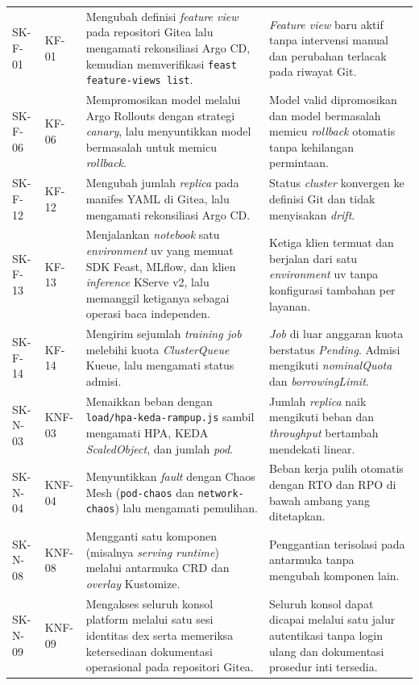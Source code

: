 {\begin{longtable}{|>{\centering\arraybackslash}m{1.4cm}|>{\centering\arraybackslash}m{1.75cm}|m{5.9cm}|m{4cm}|}
\multicolumn{4}{|l|}{\textbf{Tujuan T-1: arsitektur platform terintegrasi dan praktik GitOps}} \\
\hline
SK-F-01 & KF-01 & Mengubah definisi \textit{feature view} pada repositori Gitea lalu mengamati rekonsiliasi Argo CD, kemudian memverifikasi \texttt{feast feature-views list}. & \textit{Feature view} baru aktif tanpa intervensi manual dan perubahan terlacak pada riwayat Git. \\
\hline
SK-F-06 & KF-06 & Mempromosikan model melalui Argo Rollouts dengan strategi \textit{canary}, lalu menyuntikkan model bermasalah untuk memicu \textit{rollback}. & Model valid dipromosikan dan model bermasalah memicu \textit{rollback} otomatis tanpa kehilangan permintaan. \\
\hline
SK-F-12 & KF-12 & Mengubah jumlah \textit{replica} pada manifes YAML di Gitea, lalu mengamati rekonsiliasi Argo CD. & Status \textit{cluster} konvergen ke definisi Git dan tidak menyisakan \textit{drift}. \\
\hline
SK-F-13 & KF-13 & Menjalankan \textit{notebook} satu \textit{environment} uv yang memuat SDK Feast, MLflow, dan klien \textit{inference} KServe v2, lalu memanggil ketiganya sebagai operasi baca independen. & Ketiga klien termuat dan berjalan dari satu \textit{environment} uv tanpa konfigurasi tambahan per layanan. \\
\hline
SK-F-14 & KF-14 & Mengirim sejumlah \textit{training job} melebihi kuota \textit{ClusterQueue} Kueue, lalu mengamati status admisi. & \textit{Job} di luar anggaran kuota berstatus \textit{Pending}. Admisi mengikuti \textit{nominalQuota} dan \textit{borrowingLimit}. \\
\hline
SK-N-03 & KNF-03 & Menaikkan beban dengan \texttt{load/hpa-keda-rampup.js} sambil mengamati HPA, KEDA \textit{ScaledObject}, dan jumlah \textit{pod}. & Jumlah \textit{replica} naik mengikuti beban dan \textit{throughput} bertambah mendekati linear. \\
\hline
SK-N-04 & KNF-04 & Menyuntikkan \textit{fault} dengan Chaos Mesh (\texttt{pod-chaos} dan \texttt{network-chaos}) lalu mengamati pemulihan. & Beban kerja pulih otomatis dengan RTO dan RPO di bawah ambang yang ditetapkan. \\
\hline
SK-N-08 & KNF-08 & Mengganti satu komponen (misalnya \textit{serving runtime}) melalui antarmuka CRD dan \textit{overlay} Kustomize. & Penggantian terisolasi pada antarmuka tanpa mengubah komponen lain. \\
\hline
SK-N-09 & KNF-09 & Mengakses seluruh konsol platform melalui satu sesi identitas dex serta memeriksa ketersediaan dokumentasi operasional pada repositori Gitea. & Seluruh konsol dapat dicapai melalui satu jalur autentikasi tanpa login ulang dan dokumentasi prosedur inti tersedia. \\

\end{longtable}}
